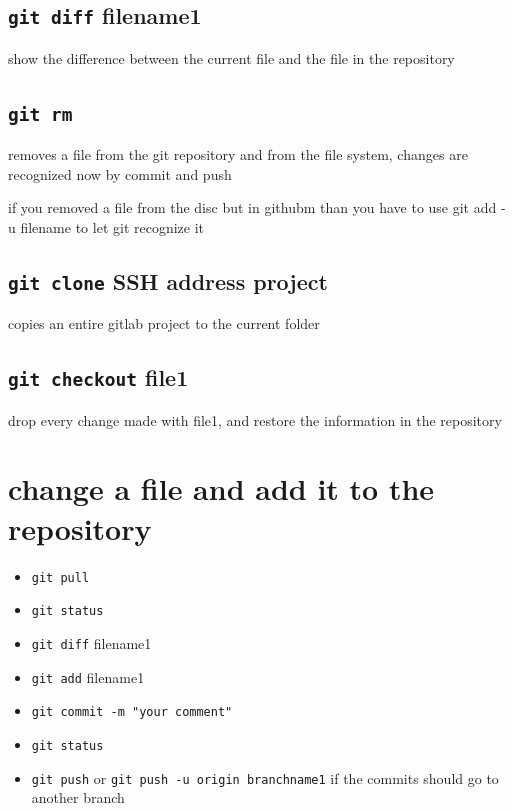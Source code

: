 \documentclass[ twoside,openright,titlepage,numbers=noenddot,headinclude,%
                footinclude=true, cleardoublepage=empty,abstractoff, %
                BCOR=5mm,paper=a4,fontsize=11pt,%
                ]{scrreprt}
\begin{document}
\subsection{\texttt{git diff} filename1}
	show the difference between the current file and the file in the repository
\subsection{\texttt{git rm}}
	removes a file from the git repository and from the file system, changes are recognized now by commit and push	
	
	if you removed a file from the disc but in githubm than you have to use git add -u filename to let git recognize it
\subsection{\texttt{git clone} SSH address project}
		copies an entire gitlab project to the current folder
\subsection{\texttt{git checkout} file1 }
		drop every change made with file1, and restore the information in the repository 
\section{change a file and add it to the repository }
	\begin{itemize}
		\item \texttt{git pull}
		\item \texttt{git status}
		\item \texttt{git diff} filename1
		\item \texttt{git add} filename1
		\item \texttt{git commit -m "your comment"}
		\item \texttt{git status}
		\item \texttt{git push} or \texttt{git push -u origin branchname1} if the commits should go to another branch
	\end{itemize}
\end{document}

